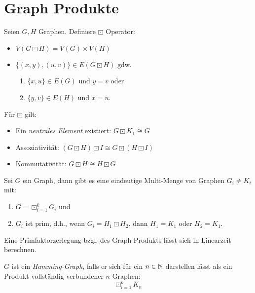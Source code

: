 \chapter{Graph Produkte}

\begin{definition}[Produkt]
    Seien $ G, H $ Graphen.
    Definiere $ \boxdot $ Operator:
    \begin{itemize}
        \item $ V(G \boxdot H) = V(G) \times V(H) $
        \item $ \{ (x, y), (u, v) \} \in E(G \boxdot H) $ gdw. \begin{enumerate}
            \item $ \{ x, u \} \in E(G) $ und $ y = v $ oder
            \item $ \{ y, v \} \in E(H) $ und $ x = u $.
        \end{enumerate}
    \end{itemize}
\end{definition}

\begin{proposition}
    Für $ \boxdot $ gilt:
    \begin{itemize}
        \item Ein \textit{neutrales Element} existiert: $ G \boxdot K_1 \cong G $
        \item Assoziativität: $ (G \boxdot H) \boxdot I \cong G \boxdot (H \boxdot I) $
        \item Kommutativität: $ G \boxdot H \cong H \boxdot G $
    \end{itemize}
\end{proposition}

\begin{theorem}
    Sei $ G $ ein Graph, dann gibt es eine eindeutige Multi-Menge von Graphen $ G_i \neq K_i $ mit:
    \begin{enumerate}
        \item $ G = \boxdot^k_{i = 1} G_i $ und
        \item $ G_i $ ist prim, d.h., wenn $ G_i = H_1 \boxdot H_2 $, dann $ H_1 = K_1 $ oder $ H_2 = K_1 $.
    \end{enumerate}
\end{theorem}

\begin{remark}
    Eine Primfaktorzerlegung bzgl. des Graph-Produkts lässt sich in Linearzeit berechnen.
\end{remark}

\begin{definition}
    $ G $ ist ein \textit{Hamming-Graph}, falls er sich für ein $ n \in \mathbb{N} $ darstellen lässt als ein Produkt vollständig verbundener $ n $ Graphen:
    \begin{equation*}
        \boxdot^k_{i = 1} K_n
    \end{equation*}
\end{definition}

